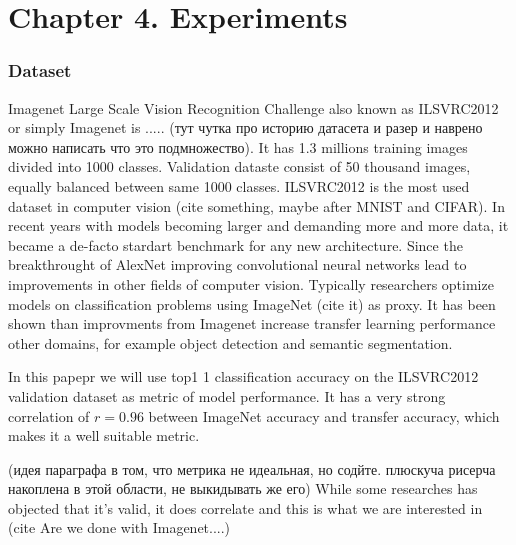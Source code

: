 
% 
\chapter{Chapter 4. Experiments}

\subsection{Dataset} \label{subsec: imagenet}


Imagenet Large Scale Vision Recognition Challenge also known as ILSVRC2012 or simply Imagenet is ..... (тут чутка про историю датасета и разер и наврено можно написать что это подмножество). It has 1.3 millions training images divided into 1000 classes. Validation dataste consist of 50 thousand images, equally balanced between same 1000 classes. ILSVRC2012 is the most used dataset in computer vision (cite something, maybe after MNIST and CIFAR). In recent years with models becoming larger and demanding more and more data, it became a de-facto stardart benchmark for any new architecture. Since the breakthrought of AlexNet improving convolutional neural networks lead to improvements in other fields of computer vision. Typically researchers optimize models on classification problems using ImageNet (cite it) as proxy. It has been shown \cite{he2019bag_of_tricks} \cite{kornblith2019better} than improvments from Imagenet increase transfer learning performance other domains, for example object detection and semantic segmentation.


In this papepr we will use top1 1 classification accuracy on the ILSVRC2012 validation dataset as metric of model performance. It has a very strong correlation of $r=0.96$ \cite{kornblith2019better} between ImageNet accuracy and transfer accuracy, which makes it a well suitable metric.


(идея параграфа в том, что метрика не идеальная, но содйте. плюскуча рисерча накоплена в этой области, не выкидывать же его)
While some researches has objected that it's valid, it does correlate and this is what we are interested in (cite Are we done with Imagenet....) \cite{beyer2020_are_we_done}